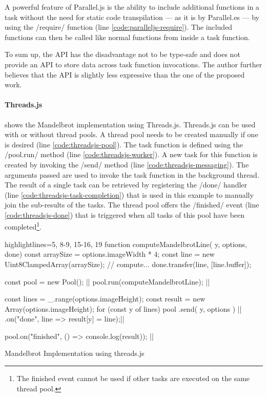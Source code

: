 A powerful feature of Parallel.js is the ability to include additional functions in a task without the need for static code transpilation --- as it is by Parallel.es --- by using the \javascriptinline/require/ function (line \ref{code:paralleljs-require}). The included functions can then be called like normal functions from inside a task function. 

To sum up, the API has the disadvantage not to be type-safe and does not provide an API to store data across task function invocations. The author further believes that the API is slightly less expressive than the one of the proposed work.

\paragraph{Threads.js}
 shows the Mandelbrot implementation using Threads.js. Threads.js can be used with or without thread pools. A thread pool needs to be created manually if one is desired (line \ref{code:threadsjs-pool}). The task function is defined using the \javascriptinline/pool.run/ method (line \ref{code:threadsjs-worker}). A new task for this function is created by invoking the \javascriptinline/send/ method (line \ref{code:threadsjs-messaging}). The arguments passed are used to invoke the task function in the background thread. The result of a single task can be retrieved by registering the \javascriptinline/done/ handler (line \ref{code:threadsjs-task-completion}) that is used in this example to manually join the sub-results of the tasks. The thread pool offers the \javascriptinline/finished/ event (line \ref{code:threadsjs-done}) that is triggered when all tasks of this pool have been completed\footnote{The finished event cannot be used if other tasks are executed on the same thread pool.}.

\begin{listing}
	\begin{javascriptcode*}{highlightlines={5, 8-9, 15-16, 19}}
function computeMandelbrotLine({ y, options}, done) {
	const arraySize = options.imageWidth * 4;
	const line = new Uint8ClampedArray(arraySize);
	// compute...
	done.transfer(line, [line.buffer]);
}

const pool = new Pool(); |$\label{code:threadsjs-pool}$|
pool.run(computeMandelbrotLine); |$\label{code:threadsjs-worker}$|

const lines = _.range(options.imageHeight);
const result = new Array(options.imageHeight);
for (const y of lines) {
	pool
		.send({ y, options }) |$\label{code:threadsjs-messaging}$|
		.on("done", line => result[y] = line);|$\label{code:threadsjs-task-completion}$|
}

pool.on("finished", () => console.log(result)); |$\label{code:threadsjs-done}$|
\end{javascriptcode*}
\caption{Mandelbrot Implementation using threads.js}
\label{fig:mandelbrot-threadsjs}
\end{listing}


